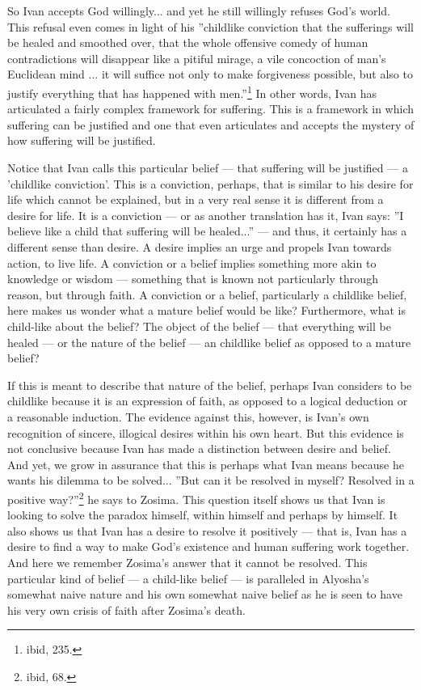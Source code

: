 So Ivan accepts God willingly... and yet he still willingly refuses God's world. This refusal even comes in light of his ''childlike conviction that the sufferings will be healed and smoothed over, that the whole offensive comedy of human contradictions will disappear like a pitiful mirage, a vile concoction of man's Euclidean mind ... it will suffice not only to make forgiveness possible, but also to justify everything that has happened with men.''\footnote{ibid, 235.} In other words, Ivan has articulated a fairly complex framework for suffering. This is a framework in which suffering can be justified and one that even articulates and accepts the mystery of how suffering will be justified.

Notice that Ivan calls this particular belief --- that suffering will be justified --- a 'childlike conviction'. This is a conviction, perhaps, that is similar to his desire for life which cannot be explained, but in a very real sense it is different from a desire for life. It is a conviction --- or as another translation has it, Ivan says: ''I believe like a child that suffering will be healed...'' --- and thus, it certainly has a different sense than desire. A desire implies an urge and propels Ivan towards action, to live life. A conviction or a belief implies something more akin to knowledge or wisdom --- something that is known not particularly through reason, but through faith. A conviction or a belief, particularly a childlike belief, here makes us wonder what a mature belief would be like? Furthermore, what is child-like about the belief? The object of the belief --- that everything will be healed --- or the nature of the belief --- an childlike belief as opposed to a mature belief?

If this is meant to describe that nature of the belief, perhaps Ivan considers to be childlike because it is an expression of faith, as opposed to a logical deduction or a reasonable induction. The evidence against this, however, is Ivan's own recognition of sincere, illogical desires within his own heart. But this evidence is not conclusive because Ivan has made a distinction between desire and belief. And yet, we grow in assurance that this is perhaps what Ivan means because he wants his dilemma to be solved... ''But can it be resolved in myself? Resolved in a positive way?''\footnote{ibid, 68.} he says to Zosima. This question itself shows us that Ivan is looking to solve the paradox himself, within himself and perhaps by himself. It also shows us that Ivan has a desire to resolve it positively --- that is, Ivan has a desire to find a way to make God's existence and human suffering work together. And here we remember Zosima's answer that it cannot be resolved. This particular kind of belief --- a child-like belief --- is paralleled in Alyosha's somewhat naive nature and his own somewhat naive belief as he is seen to have his very own crisis of faith after Zosima's death.

